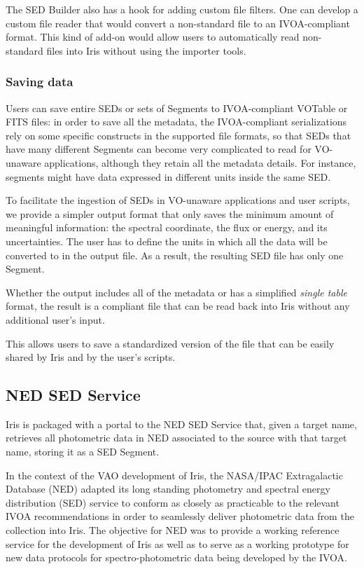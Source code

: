 \documentclass[final,5p,authoryear]{elsarticle}
\begin{document}
The SED Builder also has a hook for adding custom file filters. One can develop
a custom file reader that would convert a non-standard file to an IVOA-compliant
format. This kind of add-on would allow users to automatically read non-standard
files into Iris without using the importer tools.

\subsubsection{Saving data} Users can save entire SEDs or sets of Segments to
IVOA-compliant VOTable or FITS files: in order to save all the metadata, the
IVOA-compliant serializations rely on some specific constructs in the supported
file formats, so that SEDs that have many different Segments can become very
complicated to read for VO-unaware applications, although they retain all the
metadata details. For instance, segments might have data expressed in different
units inside the same SED.

To facilitate the ingestion of SEDs in VO-unaware applications and user scripts,
we provide a simpler output format that only saves the minimum amount of
meaningful information: the spectral coordinate, the flux or energy, and its
uncertainties. The user has to define the units in which all the data will be
converted to in the output file. As a result, the resulting SED file has only
one Segment.

Whether the output includes all of the metadata or has a simplified \emph{single
table} format, the result is a compliant file that can be read back into Iris
without any additional user's input.

This allows users to save a standardized version of the file that can be easily
shared by Iris and by the user's scripts.

\subsection{NED SED Service} \label{subsec:ned}

Iris is packaged with a portal to the NED SED
Service that, given a target name,
retrieves all photometric data in NED associated to the source with that target
name, storing it as a SED Segment.

In the context of the VAO development of Iris, the NASA/IPAC Extragalactic
Database (NED) adapted its long standing photometry and spectral energy
distribution (SED) service to conform as closely as practicable to the relevant
IVOA recommendations in order to seamlessly deliver photometric data from the
collection into Iris. The objective for NED was to provide a working reference
service for the development of Iris as well as to serve as a working prototype
for new data protocols for spectro-photometric data being developed by the IVOA.
\end{document}
